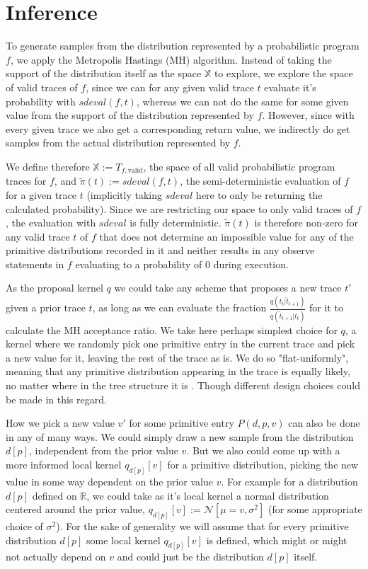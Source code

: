 \section{Inference}

To generate samples from the distribution represented by a probabilistic program $f$, we apply the Metropolis Hastings (MH) algorithm. Instead of taking the support of the distribution itself as the space $\mathbb{X}$ to explore, we explore the space of valid traces of $f$, since we can for any given valid trace $t$ evaluate it's probability with $sdeval(f,t)$, whereas we can not do the same for some given value from the support of the distribution represented by $f$. However, since with every given trace we also get a corresponding return value, we indirectly do get samples from the actual distribution represented by $f$.

We define therefore $\mathbb{X} := T_{f,\text{valid}}$, the space of all valid probabilistic program traces for $f$, and $\tilde{\pi}(t) := sdeval(f,t)$, the semi-deterministic evaluation of $f$ for a given trace $t$ (implicitly taking $sdeval$ here to only be returning the calculated probability). Since we are restricting our space to only valid traces of $f$, the evaluation with $sdeval$ is fully deterministic. $\tilde{\pi}(t)$ is therefore non-zero for any valid trace $t$ of $f$ that does not determine an impossible value for any of the primitive distributions recorded in it and neither results in any observe statements in $f$ evaluating to a probability of $0$ during execution.

As the proposal kernel $q$ we could take any scheme that proposes a new trace $t'$ given a prior trace $t$, as long as we can evaluate the fraction $\frac{q(t_t | \hat{t}_{t+1})}{q(\hat{t}_{t+1} | t_t)}$ for it to calculate the MH acceptance ratio. We take here perhaps simplest choice for $q$, a kernel where we randomly pick one primitive entry in the current trace and pick a new value for it, leaving the rest of the trace as is. We do so "flat-uniformly", meaning that any primitive distribution appearing in the trace is equally likely, no matter where in the tree structure it is \cite{wingate2011lightweight}. Though different design choices could be made in this regard.

How we pick a new value $v'$ for some primitive entry $P(d,p,v)$ can also be done in any of many ways. We could simply draw a new sample from the distribution $d[p]$, independent from the prior value $v$. But we also could come up with a more informed local kernel $q_{d[p]}[v]$ for a primitive distribution, picking the new value in some way dependent on the prior value $v$. For example for a distribution $d[p]$ defined on $\mathbb{R}$, we could take as it's local kernel a normal distribution centered around the prior value, $q_{d[p]}[v] := \mathcal{N}[\mu = v, \sigma^2]$ (for some appropriate choice of $\sigma^2$). For the sake of generality we will assume that for every primitive distribution $d[p]$ some local kernel $q_{d[p]}[v]$ is defined, which might or might not actually depend on $v$ and could just be the distribution $d[p]$ itself.


